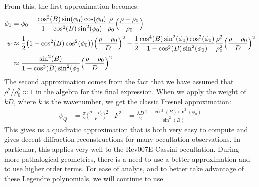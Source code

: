             From this, the first approximation becomes:
            \begin{align*}
                \phi_{1}
                &=\phi_{0}-
                \frac{\cos^{2}(B)\sin(\phi_{0})\cos(\phi_{0})}
                     {1-\cos^{2}(B)\sin^{2}(\phi_{0})}
                \frac{\rho}{\rho_{0}}
                \Big(\frac{\rho-\rho_{0}}{\rho_{0}}\Big)\\
                \psi
                &\approx
                    \frac{1}{2}\big(
                        1-\cos^{2}(B)\cos^{2}(\phi_{0})
                    \big)
                    \Big(\frac{\rho-\rho_{0}}{D}\Big)^{2}
                    -
                    \frac{1}{2}
                    \frac{%
                        \cos^{4}(B)\sin^{2}(\phi_{0})
                        \cos^{2}(\phi_{0})
                    }{
                    1-\cos^{2}(B)\sin^{2}(\phi_{0})}
                    \frac{\rho^{2}}{\rho_{0}^{2}}
                \Big(\frac{\rho-\rho_{0}}{D}\Big)^{2}\\
                &\approx
                \frac{\sin^{2}(B)}
                     {1-\cos^{2}(B)\sin^{2}(\phi_{0}}
                \Big(\frac{\rho-\rho_{0}}{D}\Big)^{2}
            \end{align*}
            The second approximation comes from the fact
            that we have assumed that
            $\rho^{2}/\rho_{0}^{2}\approx{1}$
            in the algebra for this final expression. When
            we apply the weight of $kD$, where $k$ is the
            wavenumber, we get the classic Fresnel
            approximation:
            \begin{align*}
                \psi_{Q}&=\frac{\pi}{2}
                \Big(\frac{\rho-\rho_{0}}{F}\Big)^{2}
                &
                F^{2}&=
                \frac{\lambda{D}}{2}
                    \frac{1-\cos^{2}(B)\sin^{2}(\phi_{0})}
                         {\sin^{2}(B)}
            \end{align*}
            This gives us a quadratic approximation that is
            both very easy to compute and gives decent
            diffraction reconstructions for many 
            occultation observations. In particular,
            this applies very well to the
            Rev007E Cassini occultation. During more
            pathalogical geometries, there is a need to use
            a better approximation and to use
            higher order terms. For ease of analyis, and
            to better take advantage of these Legendre
            polynomials, we will continue to use
